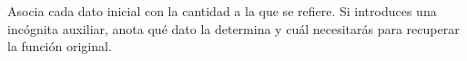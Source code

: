 Asocia cada dato inicial con la cantidad a la que se refiere. Si introduces una incógnita auxiliar, anota qué dato la determina y cuál necesitarás para recuperar la función original.
